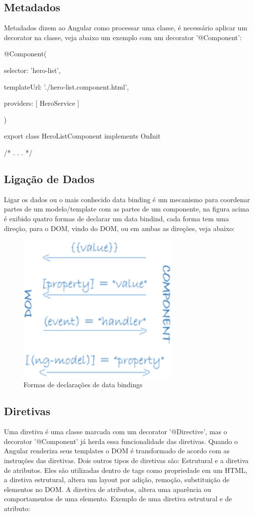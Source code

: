 \subsection{Metadados}
Metadados dizem ao Angular como processar uma classe, é necessário aplicar um decorator na classe, veja abaixo um exemplo com um decorator '@Component':

@Component({

  selector:    'hero-list',
  
  templateUrl: './hero-list.component.html',
  
  providers:  [ HeroService ]
  
})

export class HeroListComponent implements OnInit {

/* . . . */

}

\subsection{Ligação de Dados}
Ligar os dados ou o mais conhecido data binding é um mecanismo para coordenar partes de um modelo/template com as partes de um componente, na figura acima é exibido quatro formas de declarar um data bindind, cada forma tem uma direção, para o DOM, vindo do DOM, ou em ambas as direções, veja abaixo:

\begin{figure}[!h]
\centering
\includegraphics[width=8cm]{Figuras/Cap2/databinding.png}
\caption[]{Formas de declarações de data bindings}
\end{figure}

\subsection{Diretivas}
Uma diretiva é uma classe marcada com um decorator '@Directive', mas o decorator '@Component' já herda essa funcionalidade das diretivas. Quando o Angular renderiza seus templates o DOM é transformado de acordo com as instruções das diretivas. Dois outros tipos de diretivas são: Estrutural e a diretiva de atributos. Eles são utilizadas dentro de tags como propriedade em um HTML, a diretiva estrutural, altera um layout por adição, remoção, substituição de elementos no DOM. A diretiva de atributos, altera uma aparência ou comportamentos de uma elemento.
Exemplo de uma diretiva estrutural e de atributo:

